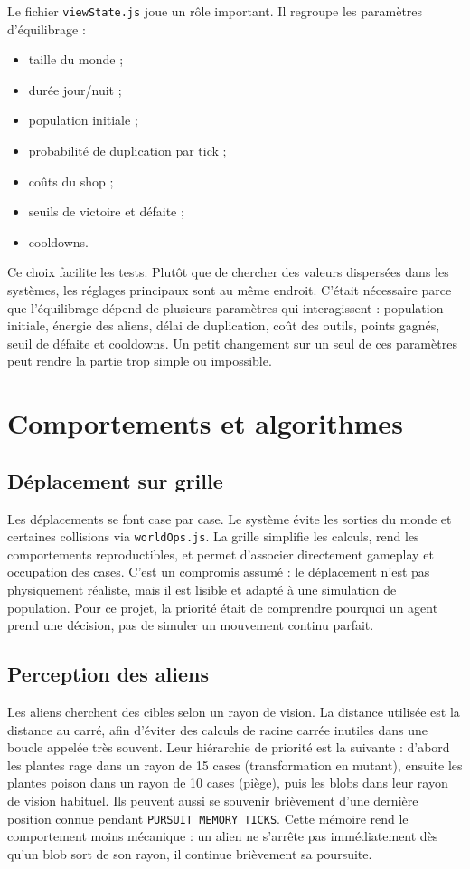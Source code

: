 ﻿\documentclass[11pt,a4paper]{article}
\begin{document}
Le fichier \texttt{viewState.js} joue un rôle important. Il regroupe les paramètres d'équilibrage :

\begin{itemize}[noitemsep]
  \item taille du monde ;
  \item durée jour/nuit ;
  \item population initiale ;
  \item probabilité de duplication par tick ;
  \item coûts du shop ;
  \item seuils de victoire et défaite ;
  \item cooldowns.
\end{itemize}

Ce choix facilite les tests. Plutôt que de chercher des valeurs dispersées dans les systèmes, les réglages principaux sont au même endroit. C'était nécessaire parce que l'équilibrage dépend de plusieurs paramètres qui interagissent : population initiale, énergie des aliens, délai de duplication, coût des outils, points gagnés, seuil de défaite et cooldowns. Un petit changement sur un seul de ces paramètres peut rendre la partie trop simple ou impossible.

\section{Comportements et algorithmes}

\subsection{Déplacement sur grille}

Les déplacements se font case par case. Le système évite les sorties du monde et certaines collisions via \texttt{worldOps.js}. La grille simplifie les calculs, rend les comportements reproductibles, et permet d'associer directement gameplay et occupation des cases. C'est un compromis assumé : le déplacement n'est pas physiquement réaliste, mais il est lisible et adapté à une simulation de population. Pour ce projet, la priorité était de comprendre pourquoi un agent prend une décision, pas de simuler un mouvement continu parfait.

\subsection{Perception des aliens}

Les aliens cherchent des cibles selon un rayon de vision. La distance utilisée est la distance au carré, afin d'éviter des calculs de racine carrée inutiles dans une boucle appelée très souvent. Leur hiérarchie de priorité est la suivante : d'abord les plantes rage dans un rayon de 15 cases (transformation en mutant), ensuite les plantes poison dans un rayon de 10 cases (piège), puis les blobs dans leur rayon de vision habituel. Ils peuvent aussi se souvenir brièvement d'une dernière position connue pendant \texttt{PURSUIT\_MEMORY\_TICKS}. Cette mémoire rend le comportement moins mécanique : un alien ne s'arrête pas immédiatement dès qu'un blob sort de son rayon, il continue brièvement sa poursuite.
\end{document}
